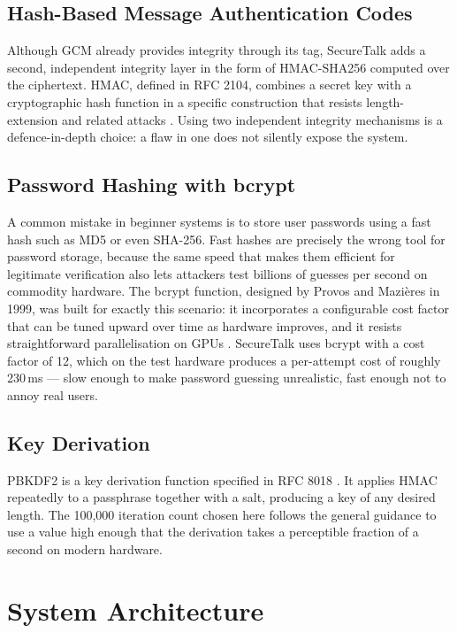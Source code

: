 \documentclass[conference]{IEEEtran}
\begin{document}
\subsection{Hash-Based Message Authentication Codes}
Although GCM already provides integrity through its tag, SecureTalk adds a second, independent integrity layer in the form of HMAC-SHA256 computed over the ciphertext. HMAC, defined in RFC 2104, combines a secret key with a cryptographic hash function in a specific construction that resists length-extension and related attacks \cite{rfc2104}. Using two independent integrity mechanisms is a defence-in-depth choice: a flaw in one does not silently expose the system.

\subsection{Password Hashing with bcrypt}
A common mistake in beginner systems is to store user passwords using a fast hash such as MD5 or even SHA-256. Fast hashes are precisely the wrong tool for password storage, because the same speed that makes them efficient for legitimate verification also lets attackers test billions of guesses per second on commodity hardware. The bcrypt function, designed by Provos and Mazi\`eres in 1999, was built for exactly this scenario: it incorporates a configurable cost factor that can be tuned upward over time as hardware improves, and it resists straightforward parallelisation on GPUs \cite{bcrypt1999}. SecureTalk uses bcrypt with a cost factor of 12, which on the test hardware produces a per-attempt cost of roughly 230\,ms --- slow enough to make password guessing unrealistic, fast enough not to annoy real users.

\subsection{Key Derivation}
PBKDF2 is a key derivation function specified in RFC 8018 \cite{rfc8018}. It applies HMAC repeatedly to a passphrase together with a salt, producing a key of any desired length. The 100{,}000 iteration count chosen here follows the general guidance to use a value high enough that the derivation takes a perceptible fraction of a second on modern hardware.

\section{System Architecture}
\label{sec:design}
\end{document}
